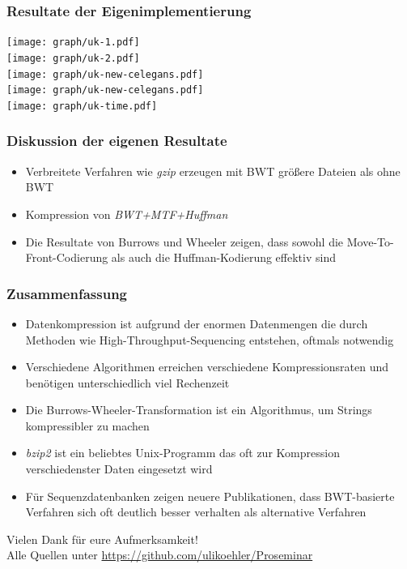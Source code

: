 \documentclass[14pt,xcolor=dvipsnames,pdftex]{beamer}
\begin{document}
\begin{frame}[allowframebreaks]
 \frametitle{Resultate der Eigenimplementierung}
 \texttt{[image: graph/uk-1.pdf]}
 \framebreak\\
 \texttt{[image: graph/uk-2.pdf]}
 \framebreak\\
 \texttt{[image: graph/uk-new-celegans.pdf]}
 \framebreak\\
 \texttt{[image: graph/uk-new-celegans.pdf]}
 \framebreak\\
 \texttt{[image: graph/uk-time.pdf]}
\end{frame}
\begin{frame}
 \frametitle{Diskussion der eigenen Resultate}
 \begin{itemize}
  \item Verbreitete Verfahren wie \textit{gzip} erzeugen mit BWT größere Dateien als ohne BWT
  \item Kompression von \textit{BWT+MTF+Huffman}
  \item Die Resultate von Burrows und Wheeler zeigen, dass sowohl die Move-To-Front-Codierung als auch die Huffman-Kodierung effektiv sind
 \end{itemize}
\end{frame}

\begin{frame}[allowframebreaks]
 \frametitle{Zusammenfassung}
 \begin{itemize}
  \item Datenkompression ist aufgrund der enormen Datenmengen die durch Methoden wie High-Throughput-Sequencing entstehen, oftmals notwendig
  \item Verschiedene Algorithmen erreichen verschiedene Kompressionsraten und benötigen unterschiedlich viel Rechenzeit
 \end{itemize}
 \framebreak
 \begin{itemize}
  \item Die Burrows-Wheeler-Transformation ist ein Algorithmus, um Strings kompressibler zu machen
  \item \textit{bzip2} ist ein beliebtes Unix-Programm das oft zur Kompression verschiedenster Daten eingesetzt wird
  \item Für Sequenzdatenbanken zeigen neuere Publikationen, dass BWT-basierte Verfahren sich oft deutlich besser verhalten als alternative Verfahren
 \end{itemize}
\end{frame}
\begin{frame}
 \begin{center}
  {\color{BlueViolet}\large Vielen Dank für eure Aufmerksamkeit!}\\\vspace{1cm}
  Alle Quellen unter \url{https://github.com/ulikoehler/Proseminar}
 \end{center}

\end{frame}
\end{document}
